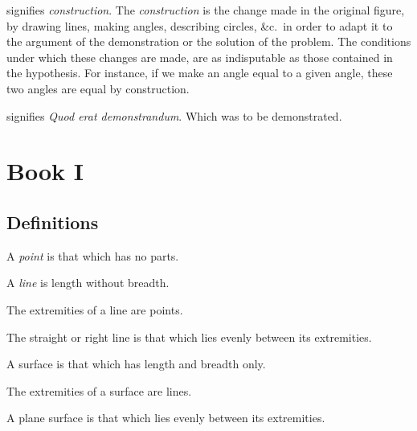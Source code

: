 \symb{\conststr}
 signifies \emph{construction}. The \emph{construction} is the change made in the original figure, by drawing lines, making angles, describing circles, \&c.\ in order to adapt it to the argument of the demonstration or the solution of the problem. The conditions under which these changes are made, are as indisputable as those contained in the hypothesis. For instance, if we make an angle equal to a given angle, these two angles are equal by construction.

\symb{\qedstr}
signifies \emph{Quod erat demonstrandum}. Which was to be demonstrated.


\part{Book I}


\chapter*{Definitions}

\startdefinition{}\label{def:I.I}
\begin{center}
A \emph{point} is that which has no parts.
\end{center}


\startdefinition{}\label{def:I.II}
\begin{center}
A \emph{line} is length without breadth.
\end{center}


\startdefinition{}\label{def:I.III}
\begin{center}
The extremities of a line are points.
\end{center}


\startdefinition{}\label{def:I.IV}
\begin{center}
The straight or right line is that which lies evenly between its extremities.
\end{center}


\startdefinition{}\label{def:I.V}
\begin{center}
A surface is that which has length and breadth only.
\end{center}


\startdefinition{}\label{def:I.VI}
\begin{center}
The extremities of a surface are lines.
\end{center}


\startdefinition{}\label{def:I.VII}
\begin{center}
A plane surface is that which lies evenly between its extremities.
\end{center}



